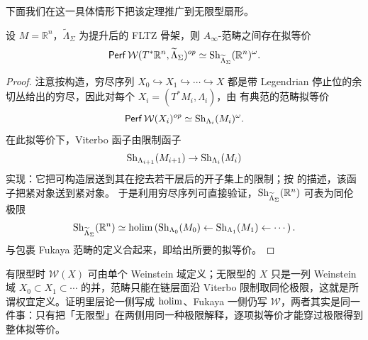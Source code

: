     下面我们在这一具体情形下把该定理推广到无限型扇形。
\begin{prp}\label{prp:inf-type-sheaf-Floer-Rn}
    设 $M=\mathbb{R}^n$，$\widetilde{\Lambda}_{\Sigma}$ 为提升后的 FLTZ 骨架，则 $A_{\infty}$-范畴之间存在拟等价
\[
        \operatorname{\mathsf{Perf}}\mathcal{W} (T^{\ast}\mathbb{R}^n,\widetilde{\Lambda}_{\Sigma})^{op}\simeq\operatorname{Sh}_{\widetilde{\Lambda}_{\Sigma}} (\mathbb{R}^n)^{\omega}.
    \]
\end{prp}
\begin{proof}
    注意按构造，穷尽序列 $X_0\hookrightarrow X_1\hookrightarrow\dotsb\hookrightarrow X$ 都是带 Legendrian 停止位的余切丛给出的穷尽，因此对每个 $X_i=(T^{\ast} M_i,\Lambda_i)$，由 \cite{GPS24M} 有典范的范畴拟等价
\[
        \operatorname{\mathsf{Perf}}\mathcal{W} (X_i)^{op}\simeq\operatorname{Sh}_{\Lambda_i} (M_i)^{\omega}.
    \]
在此拟等价下，Viterbo 函子由限制函子
\[
    \operatorname{Sh}_{\Lambda_{i+1}} (M_{i+1})\to\operatorname{Sh}_{\Lambda_i} (M_i)
    \]
实现：它把可构造层送到其在挖去若干层后的开子集上的限制；按 \cite[Lemma 4.18]{GPS24M} 的描述，该函子把紧对象送到紧对象。
    于是利用穷尽序列可直接验证，$\operatorname{Sh}_{\widetilde{\Lambda}_{\Sigma}} (\mathbb{R}^n)$ 可表为同伦极限
\[
        \operatorname{Sh}_{\widetilde{\Lambda}_{\Sigma}} (\mathbb{R}^n)\simeq\operatorname*{holim}\left(\operatorname{Sh}_{\Lambda_0} (M_0)\leftarrow\operatorname{Sh}_{\Lambda_1} (M_1)\leftarrow\dotsb\right).
    \]
\cite[Proposition 4.20]{GPS24M} 与包裹 Fukaya 范畴的定义合起来，即给出所要的拟等价。
\end{proof}

\begin{yizhu}[无限型为何落到同伦极限]
    有限型时 $\mathcal{W}(X)$ 可由单个 Weinstein 域定义；无限型的 $X$ 只是一列 Weinstein 域 $X_0\subset X_1\subset\dotsb$ 的并，范畴只能在链层面沿 Viterbo 限制取同伦极限，这就是所谓权宜定义。证明里层论一侧写成 $\operatorname*{holim}$、Fukaya 一侧仍写 $\mathcal{W}$，两者其实是同一件事：只有把「无限型」在两侧用同一种极限解释，逐项拟等价才能穿过极限得到整体拟等价。
\end{yizhu}

